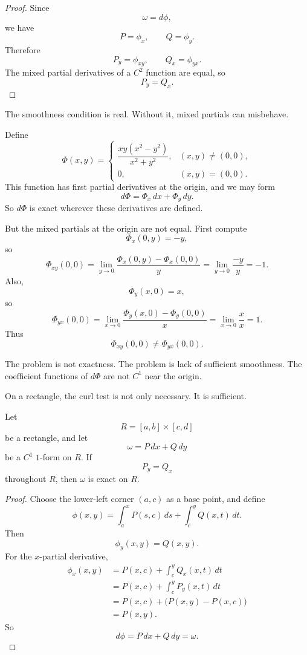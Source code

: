 \begin{proof}
Since
\[
    \omega=d\phi,
\]
we have
\[
    P=\phi_x,
    \qquad
    Q=\phi_y.
\]
Therefore
\[
    P_y=\phi_{xy},
    \qquad
    Q_x=\phi_{yx}.
\]
The mixed partial derivatives of a \(C^2\) function are equal, so
\[
    P_y=Q_x.
\]
\end{proof}

The smoothness condition is real.  Without it, mixed partials can misbehave.

\begin{example}
Define
\[
    \Phi(x,y)=
    \begin{cases}
    \dfrac{xy(x^2-y^2)}{x^2+y^2}, & (x,y)\ne(0,0),\\[2mm]
    0, & (x,y)=(0,0).
    \end{cases}
\]
This function has first partial derivatives at the origin, and we may form
\[
    d\Phi=\Phi_x\,dx+\Phi_y\,dy.
\]
So \(d\Phi\) is exact wherever these derivatives are defined.

But the mixed partials at the origin are not equal.  First compute
\[
    \Phi_x(0,y)=-y,
\]
so
\[
    \Phi_{xy}(0,0)
    =
    \lim_{y\to0}\frac{\Phi_x(0,y)-\Phi_x(0,0)}{y}
    =
    \lim_{y\to0}\frac{-y}{y}
    =
    -1.
\]
Also,
\[
    \Phi_y(x,0)=x,
\]
so
\[
    \Phi_{yx}(0,0)
    =
    \lim_{x\to0}\frac{\Phi_y(x,0)-\Phi_y(0,0)}{x}
    =
    \lim_{x\to0}\frac{x}{x}
    =
    1.
\]
Thus
\[
    \Phi_{xy}(0,0)\ne \Phi_{yx}(0,0).
\]

The problem is not exactness.  The problem is lack of sufficient smoothness.  The
coefficient functions of \(d\Phi\) are not \(C^1\) near the origin.
\end{example}

On a rectangle, the curl test is not only necessary.  It is sufficient.

\begin{theorem}
Let
\[
    R=[a,b]\times[c,d]
\]
be a rectangle, and let
\[
    \omega=P\,dx+Q\,dy
\]
be a \(C^1\) \(1\)-form on \(R\).  If
\[
\boxed{
    P_y=Q_x
}
\]
throughout \(R\), then \(\omega\) is exact on \(R\).
\end{theorem}

\begin{proof}
Choose the lower-left corner \((a,c)\) as a base point, and define
\[
    \phi(x,y)
    =
    \int_a^x P(s,c)\,ds
    +
    \int_c^y Q(x,t)\,dt.
\]
Then
\[
    \phi_y(x,y)=Q(x,y).
\]
For the \(x\)-partial derivative,
\[
\begin{aligned}
    \phi_x(x,y)
    &=
    P(x,c)+\int_c^y Q_x(x,t)\,dt\\
    &=
    P(x,c)+\int_c^y P_y(x,t)\,dt\\
    &=
    P(x,c)+\bigl(P(x,y)-P(x,c)\bigr)\\
    &=
    P(x,y).
\end{aligned}
\]
So
\[
    d\phi=P\,dx+Q\,dy=\omega.
\]
\end{proof}

